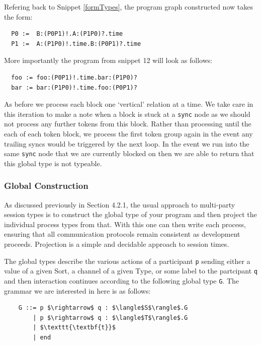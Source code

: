 \documentclass[11pt, abstracton, twoside, titlepage=true]{scrartcl}
\begin{document}
Refering back to Snippet \ref{formTypes}, the program graph constructed now takes
the form:
\\
\begin{lstlisting}
  P0 :=  B:(P0P1)!.A:(P1P0)?.time
  P1 :=  A:(P1P0)!.time.B:(P0P1)?.time
\end{lstlisting}

More importantly the program from snippet 12 will look as follows:
\\
\begin{lstlisting}
  foo := foo:(P0P1)!.time.bar:(P1P0)?
  bar := bar:(P1P0)!.time.foo:(P0P1)?
\end{lstlisting}

As before we process each block one `vertical' relation at a time. We take
care in this iteration to make a note when a block is stuck at a \texttt{sync}
node as we should not process any further tokens from this block. Rather than
processing until the each of each token block, we process the first token group
again in the event any trailing syncs would be triggered by the next loop. In
the event we run into the same \texttt{sync} node that we are currently blocked
on then we are able to return that this global type is not typeable.


\subsubsection{Global Construction}




As discussed previously in Section 4.2.1, the usual approach to multi-party session 
types is to construct the global type of your program and then project the 
individual process types from that. With this one can then write each process, 
ensuring that all communication protocols remain consistent as development 
proceeds. Projection is a simple and decidable approach to session times.

The global types describe the various actions of a participant \texttt{p} sending
either a value of a given Sort, a channel of a given Type, or some label to the
partcipant \texttt{q} and then interaction continues according to the following
global type \texttt{G}. The grammar we are interested in here is as follows:
\\
\begin{lstlisting}
    G ::= p $\rightarrow$ q : $\langle$S$\rangle$.G
        | p $\rightarrow$ q : $\langle$T$\rangle$.G
        | $\texttt{\textbf{t}}$
        | end
\end{lstlisting}
\end{document}
